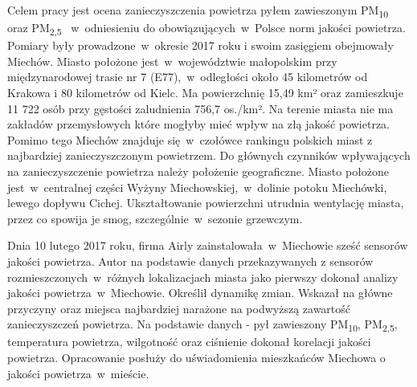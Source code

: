 \documentclass[\main/boa.tex]{subfiles}
\begin{document}
Celem pracy jest ocena zanieczyszczenia powietrza pyłem zawieszonym PM\textsubscript{10} oraz PM\textsubscript{2,5} ~w~odniesieniu do obowiązujących~w~Polsce norm jakości powietrza. Pomiary były prowadzone~w~okresie 2017 roku i swoim zasięgiem obejmowały Miechów. Miasto położone jest~w~województwie małopolskim przy międzynarodowej trasie nr 7 (E77),~w~odległości około 45 kilometrów od Krakowa i 80 kilometrów od Kielc. Ma powierzchnię 15,49 km² oraz zamieszkuje 11 722 osób przy gęstości zaludnienia 756,7 os./km². Na terenie miasta nie ma zakładów przemysłowych które mogłyby mieć wpływ na złą jakość powietrza. Pomimo tego Miechów znajduje się~w~czołówce rankingu polskich miast z najbardziej zanieczyszczonym powietrzem. Do głównych czynników wpływających na zanieczyszczenie powietrza należy położenie geograficzne. Miasto położone jest~w~centralnej części Wyżyny Miechowskiej,~w~dolinie potoku Miechówki, lewego dopływu Cichej. Ukształtowanie powierzchni utrudnia wentylację miasta, przez co spowija je smog, szczególnie~w~sezonie grzewczym.

Dnia 10 lutego 2017 roku, firma Airly zainstalowała~w~Miechowie sześć sensorów jakości powietrza. Autor na podstawie danych przekazywanych z sensorów rozmieszczonych~w~różnych lokalizacjach miasta jako pierwszy dokonał analizy jakości powietrza~w~Miechowie. Określił dynamikę zmian. Wskazał na główne przyczyny oraz miejsca najbardziej narażone na podwyższą zawartość zanieczyszczeń powietrza. Na podstawie danych - pył zawieszony PM\textsubscript{10}, PM\textsubscript{2,5}, temperatura powietrza, wilgotność oraz ciśnienie dokonał korelacji jakości powietrza. Opracowanie posłuży do uświadomienia mieszkańców Miechowa o jakości powietrza~w~mieście.
\end{document}

